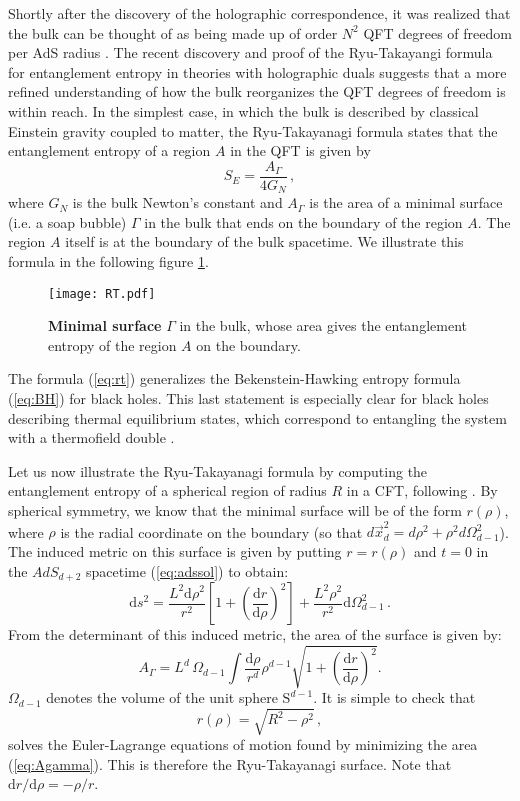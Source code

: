 \documentclass[10pt, oneside]{book}
\def\be{\begin{equation}}
\def\ee{\end{equation}}
\begin{document}
\begin{doublespace}
Shortly after the discovery of the holographic correspondence, it was realized that the bulk can be thought of as being made up of order $N^2$ QFT degrees of freedom per AdS radius \cite{Susskind:1998dq}. The recent discovery \cite{Ryu:2006bv, Ryu:2006ef, Nishioka:2009un} and proof \cite{Lewkowycz:2013nqa} of the Ryu-Takayangi formula for entanglement entropy in theories with holographic duals suggests that a more refined understanding of how the bulk reorganizes the QFT degrees of freedom is within reach. In the simplest case, in which the bulk is described by classical Einstein gravity coupled to matter, the Ryu-Takayanagi formula states that the entanglement entropy of a region $A$ in the QFT is given by
\be\label{eq:rt}
S_E = \frac{A_\Gamma}{4 G_N} \,,
\ee
where $G_N$ is the bulk Newton's constant and $A_\Gamma$ is the area of a minimal surface (i.e. a soap bubble) $\Gamma$ in the bulk that ends on the boundary of the region $A$. The region $A$ itself is at the boundary of the bulk spacetime. We illustrate this formula in the following figure \ref{fig:RT}.
\begin{figure}[h]
\centering
\texttt{[image: RT.pdf]}
\caption{\label{fig:RT} {\bf Minimal surface} $\Gamma$ in the bulk, whose area gives the entanglement entropy of the region $A$ on the boundary.}
\end{figure}
The formula (\ref{eq:rt}) generalizes the Bekenstein-Hawking entropy formula (\ref{eq:BH}) for black holes. This last statement is especially clear for black holes describing thermal equilibrium states, which correspond to entangling the system with a thermofield double \cite{Maldacena:2001kr}.

Let us now illustrate the Ryu-Takayanagi formula by computing the entanglement entropy of a spherical region of radius $R$ in a CFT, following \cite{Ryu:2006ef}.    By spherical symmetry, we know that the minimal surface will be of the form $r(\rho)$, where $\rho$ is the radial coordinate on the boundary (so that $d\vec x^2_d = d\rho^2 + \rho^2 d\Omega^2_{d-1}$). The induced metric on this surface is given by putting $r = r(\rho)$ and $t=0$ in the $AdS_{d+2}$ spacetime (\ref{eq:adssol}) to obtain: \begin{equation}
\mathrm{d}s^2 = \frac{L^2\mathrm{d}\rho^2}{r^2}\left[1+\left(\frac{\mathrm{d}r}{\mathrm{d}\rho}\right)^2\right] + \frac{L^2\rho^2}{r^2}\mathrm{d}\Omega_{d-1}^2 \,.
\end{equation}
From the determinant of this induced metric, the area of the surface is given by:
\begin{equation}
A_\Gamma = L^d \, \Omega_{d-1} \int \frac{\mathrm{d}\rho}{r^d}\rho^{d-1}\sqrt{1+\left(\frac{\mathrm{d}r}{\mathrm{d}\rho}\right)^2}.  \label{eq:Agamma}
\end{equation}
$\Omega_{d-1}$ denotes the volume of the unit sphere $\mathrm{S}^{d-1}$.  It is simple to check that \begin{equation}
r(\rho) = \sqrt{R^2-\rho^2} \,, \label{eq:Agammasol}
\end{equation}
solves the Euler-Lagrange equations of motion found by minimizing the area (\ref{eq:Agamma}). This is therefore the Ryu-Takayanagi surface. Note that $\mathrm{d}r/\mathrm{d}\rho = -\rho/r$.


\end{doublespace}
\end{document}
